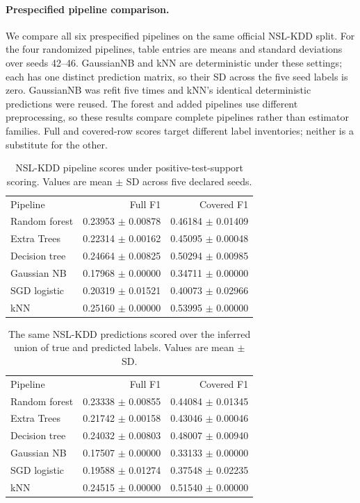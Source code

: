 \documentclass[journal]{IEEEtran}
\begin{document}
\paragraph{Prespecified pipeline comparison.}
We compare all six prespecified pipelines on the same official NSL-KDD split. For the four randomized pipelines, table entries are means and standard deviations over seeds 42--46. GaussianNB and kNN are deterministic under these settings; each has one distinct prediction matrix, so their SD across the five seed labels is zero. GaussianNB was refit five times and kNN's identical deterministic predictions were reused. The forest and added pipelines use different preprocessing, so these results compare complete pipelines rather than estimator families. Full and covered-row scores target different label inventories; neither is a substitute for the other.
\begin{table}[h]\centering
\caption{NSL-KDD pipeline scores under positive-test-support scoring. Values are mean $\pm$ SD across five declared seeds.}
\begin{tabular}{lrr}
Pipeline & Full F1 & Covered F1\\
Random forest & 0.23953 $\pm$ 0.00878 & 0.46184 $\pm$ 0.01409\\
Extra Trees & 0.22314 $\pm$ 0.00162 & 0.45095 $\pm$ 0.00048\\
Decision tree & 0.24664 $\pm$ 0.00825 & 0.50294 $\pm$ 0.00985\\
Gaussian NB & 0.17968 $\pm$ 0.00000 & 0.34711 $\pm$ 0.00000\\
SGD logistic & 0.20319 $\pm$ 0.01521 & 0.40073 $\pm$ 0.02966\\
kNN & 0.25160 $\pm$ 0.00000 & 0.53995 $\pm$ 0.00000\\
\end{tabular}\end{table}
\begin{table}[h]\centering
\caption{The same NSL-KDD predictions scored over the inferred union of true and predicted labels. Values are mean $\pm$ SD.}
\begin{tabular}{lrr}
Pipeline & Full F1 & Covered F1\\
Random forest & 0.23338 $\pm$ 0.00855 & 0.44084 $\pm$ 0.01345\\
Extra Trees & 0.21742 $\pm$ 0.00158 & 0.43046 $\pm$ 0.00046\\
Decision tree & 0.24032 $\pm$ 0.00803 & 0.48007 $\pm$ 0.00940\\
Gaussian NB & 0.17507 $\pm$ 0.00000 & 0.33133 $\pm$ 0.00000\\
SGD logistic & 0.19588 $\pm$ 0.01274 & 0.37548 $\pm$ 0.02235\\
kNN & 0.24515 $\pm$ 0.00000 & 0.51540 $\pm$ 0.00000\\
\end{tabular}\end{table}
\end{document}
